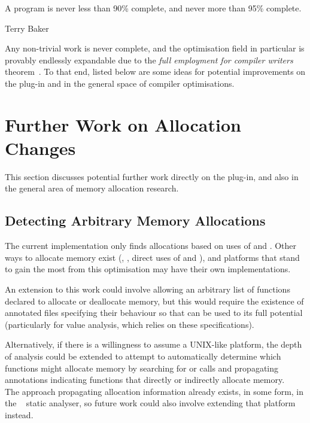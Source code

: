 \epigraph{A program is never less than 90\% complete, and never more than 95\% complete.}{Terry Baker}

Any non-trivial work is never complete, and the optimisation field in particular is provably endlessly expandable due to the \textit{full employment for compiler writers} theorem~\cite{compilerimpl}. To that end, listed below are some ideas for potential improvements on the  plug-in and in the general space of compiler optimisations.

\section{Further Work on Allocation Changes}

This section discusses potential further work directly on the  plug-in, and also in the general area of memory allocation research.

\subsection{Detecting Arbitrary Memory Allocations}

The current implementation only finds allocations based on uses of \malloc{} and \free{}. Other ways to allocate memory exist (, , direct uses of  and ), and platforms that stand to gain the most from this optimisation may have their own implementations.

An extension to this work could involve allowing an arbitrary list of functions declared to allocate or deallocate memory, but this would require the existence of annotated files specifying their behaviour so that  can be used to its full potential (particularly for value analysis, which relies on these specifications).

Alternatively, if there is a willingness to assume a UNIX-like platform, the depth of analysis could be extended to attempt to automatically determine which functions might allocate memory by searching for  or  calls and propagating annotations indicating functions that directly or indirectly allocate memory.\\
The approach propagating allocation information already exists, in some form, in the ~\cite{fbinfer} static analyser, so future work could also involve extending that platform instead.

